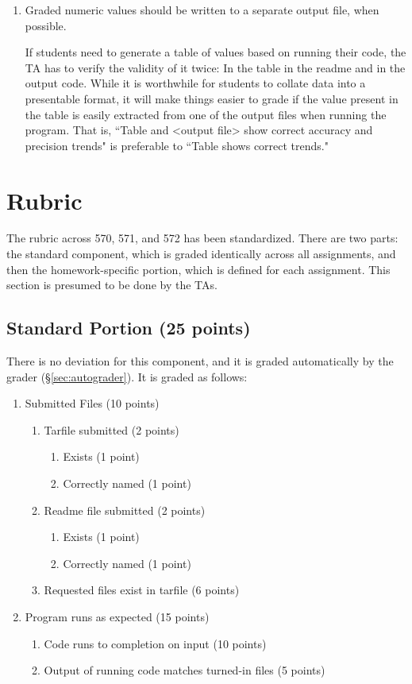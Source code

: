 \documentclass[12pt]{article}
\begin{document}
\begin{enumerate}
 \item {Graded numeric values should be written to a separate output file, when possible.

 If students need to generate a table of values based on running their code, the TA has to verify the validity of it twice: In the table in the readme and in the output code. While it is worthwhile for students to collate data into a presentable format, it will make things easier to grade if the value present in the table is easily extracted from one of the output files when running the program. That is, ``Table and {\textless}output file{\textgreater} show correct accuracy and precision trends" is preferable to ``Table shows correct trends." }
\end{enumerate}

\section{Rubric} \label{sec:rubric}

The rubric across 570, 571, and 572 has been standardized. There are two parts: the standard component, which is graded identically across all assignments, and then the homework-specific portion, which is defined for each assignment. This section is presumed to be done by the TAs.

\subsection{Standard Portion (25 points)} \label{sec:standardrubric}

There is no deviation for this component, and it is graded automatically by the grader (\S\ref{sec:autograder}). It is graded as follows:

\begin{enumerate}
\item Submitted Files (10 points)
  \begin{enumerate}
    \item Tarfile submitted (2 points)
    \begin{enumerate}
      \item Exists (1 point)
      \item Correctly named (1 point)
    \end{enumerate}
    \item Readme file submitted (2 points)
    \begin{enumerate}
      \item Exists (1 point)
      \item Correctly named (1 point)
    \end{enumerate}
    \item Requested files exist in tarfile (6 points)
  \end{enumerate}
  \item Program runs as expected (15 points)
  \begin{enumerate}
    \item Code runs to completion on input (10 points)
    \item Output of running code matches turned-in files (5 points)
  \end{enumerate}
\end{enumerate}
\end{document}
